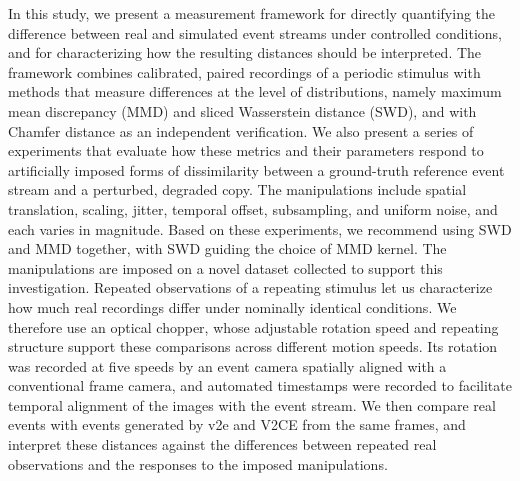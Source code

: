 In this study, we present a measurement framework for directly quantifying the difference between real and simulated event streams under controlled conditions, and for characterizing how the resulting distances should be interpreted. The framework combines calibrated, paired recordings of a periodic stimulus with methods that measure differences at the level of distributions, namely maximum mean discrepancy (MMD) and sliced Wasserstein distance (SWD), and with Chamfer distance as an independent verification. We also present a series of experiments that evaluate how these metrics and their parameters respond to artificially imposed forms of dissimilarity between a ground-truth reference event stream and a perturbed, degraded copy. The manipulations include spatial translation, scaling, jitter, temporal offset, subsampling, and uniform noise, and each varies in magnitude. Based on these experiments, we recommend using SWD and MMD together, with SWD guiding the choice of MMD kernel.
The manipulations are imposed on a novel dataset collected to support this investigation. Repeated observations of a repeating stimulus let us characterize how much real recordings differ under nominally identical conditions. We therefore use an optical chopper, whose adjustable rotation speed and repeating structure support these comparisons across different motion speeds. Its rotation was recorded at five speeds by an event camera spatially aligned with a conventional frame camera, and automated timestamps were recorded to facilitate temporal alignment of the images with the event stream. We then compare real events with events generated by v2e and V2CE from the same frames, and interpret these distances against the differences between repeated real observations and the responses to the imposed manipulations.

